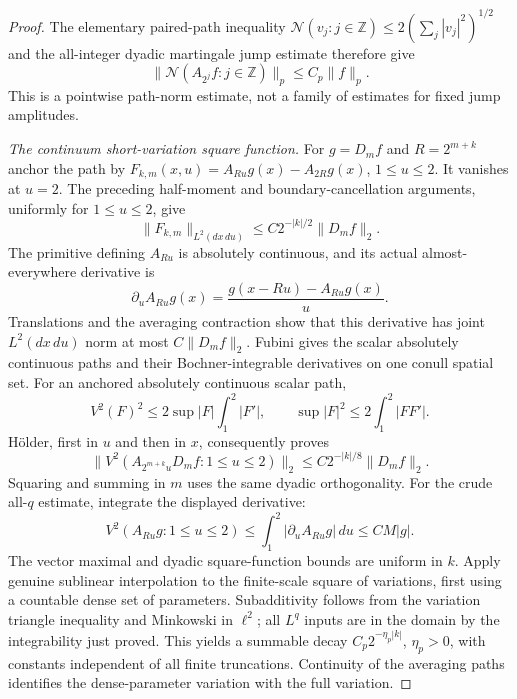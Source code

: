 \documentclass[11pt]{article}
\numberwithin{equation}{section}
\theoremstyle{remark}
\theoremstyle{definition}
\newcommand{\NN}{\mathcal N}
\begin{document}
\begin{proof}
The elementary paired-path inequality
$\NN(v_j:j\in\mathbb Z)\le2(\sum_j|v_j|^2)^{1/2}$ and the
all-integer dyadic martingale jump estimate therefore give
\begin{equation}\label{eq:one-sided-average-long-jumps}
 \|\NN(A_{2^j}f:j\in\mathbb Z)\|_p\le C_p\|f\|_p.
\end{equation}
This is a pointwise path-norm estimate, not a family of estimates for
fixed jump amplitudes.

\smallskip\noindent
\emph{The continuum short-variation square function.}
For $g=D_mf$ and $R=2^{m+k}$ anchor the path by
$F_{k,m}(x,u)=A_{Ru}g(x)-A_{2R}g(x)$, $1\le u\le2$.
It vanishes at $u=2$.  The preceding half-moment and boundary-cancellation
arguments, uniformly for $1\le u\le2$, give
\[
 \|F_{k,m}\|_{L^2(dx\,du)}\le C2^{-|k|/2}\|D_mf\|_2.
\]
The primitive defining $A_{Ru}$ is absolutely continuous, and its
actual almost-everywhere derivative is
\[
 \partial_uA_{Ru}g(x)=\frac{g(x-Ru)-A_{Ru}g(x)}u.
\]
Translations and the averaging contraction show that this derivative
has joint $L^2(dx\,du)$ norm at most $C\|D_mf\|_2$.
Fubini gives the scalar absolutely continuous paths and their
Bochner-integrable derivatives on one conull spatial set.
For an anchored absolutely continuous scalar path,
\[
 V^2(F)^2\le2\sup|F|\int_1^2|F'|,
 \qquad \sup|F|^2\le2\int_1^2|F F'|.
\]
H\"older, first in $u$ and then in $x$, consequently proves
\begin{equation}\label{eq:one-sided-average-short-L2}
 \|V^2(A_{2^{m+k}u}D_mf:1\le u\le2)\|_2
 \le C2^{-|k|/8}\|D_mf\|_2.
\end{equation}
Squaring and summing in $m$ uses the same dyadic orthogonality.
For the crude all-$q$ estimate, integrate the displayed derivative:
\[
 V^2(A_{Ru}g:1\le u\le2)
 \le\int_1^2|\partial_uA_{Ru}g|\,du\le C M|g|.
\]
The vector maximal and dyadic square-function bounds are uniform in
$k$.  Apply genuine sublinear interpolation to the finite-scale square
of variations, first using a countable dense set of parameters.
Subadditivity follows from the variation triangle inequality and
Minkowski in $\ell^2$; all $L^q$ inputs are in the domain by the
integrability just proved.  This yields a summable decay
$C_p2^{-\eta_p|k|}$, $\eta_p>0$, with constants independent of all
finite truncations.  Continuity of the averaging paths identifies
the dense-parameter variation with the full variation.


\end{proof}
\end{document}
